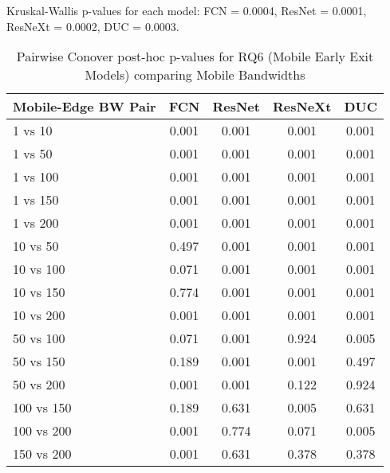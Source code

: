 \begin{table}[h]
\centering
\caption{Pairwise Conover post-hoc p-values for RQ6 (Mobile Early Exit Models) comparing Mobile Bandwidths}
\label{tab:conover_mobile_earlyexit}
\smallskip
Kruskal-Wallis p-values for each model: FCN = 0.0004, ResNet = 0.0001, ResNeXt = 0.0002, DUC = 0.0003.

\begin{tabular}{lcccc}
\toprule
Mobile-Edge BW Pair & FCN & ResNet & ResNeXt & DUC \\
\midrule
1 vs 10 & 0.001 & 0.001 & 0.001 & 0.001 \\
1 vs 50 & 0.001 & 0.001 & 0.001 & 0.001 \\
1 vs 100 & 0.001 & 0.001 & 0.001 & 0.001 \\
1 vs 150 & 0.001 & 0.001 & 0.001 & 0.001 \\
1 vs 200 & 0.001 & 0.001 & 0.001 & 0.001 \\
10 vs 50 & 0.497 & 0.001 & 0.001 & 0.001 \\
10 vs 100 & 0.071 & 0.001 & 0.001 & 0.001 \\
10 vs 150 & 0.774 & 0.001 & 0.001 & 0.001 \\
10 vs 200 & 0.001 & 0.001 & 0.001 & 0.001 \\
50 vs 100 & 0.071 & 0.001 & 0.924 & 0.005 \\
50 vs 150 & 0.189 & 0.001 & 0.001 & 0.497 \\
50 vs 200 & 0.001 & 0.001 & 0.122 & 0.924 \\
100 vs 150 & 0.189 & 0.631 & 0.005 & 0.631 \\
100 vs 200 & 0.001 & 0.774 & 0.071 & 0.005 \\
150 vs 200 & 0.001 & 0.631 & 0.378 & 0.378 \\
\bottomrule
\end{tabular}
\end{table}
